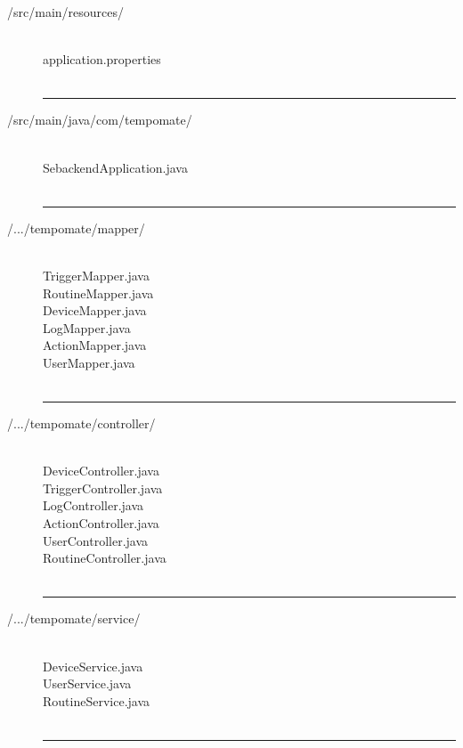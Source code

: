 \begin{enumerate}[label=\alph*]
\begin{description}
        \item[/src/main/resources/] \hfill \\
        \footnotesize
application.properties \\\\
    \vspace{-0.2cm}
    \hrule
    \vspace{0.2cm}

        \item[/src/main/java/com/tempomate/] \hfill \\
        \footnotesize
SebackendApplication.java \\\\
    \vspace{-0.2cm}
    \hrule
    \vspace{0.2cm}

        \item[/.../tempomate/mapper/] \hfill \\
        \footnotesize
TriggerMapper.java \\
RoutineMapper.java \\
DeviceMapper.java \\
LogMapper.java \\
ActionMapper.java \\
UserMapper.java \\\\
    \vspace{-0.2cm}
    \hrule
    \vspace{0.2cm}

        \item[/.../tempomate/controller/] \hfill \\
        \footnotesize
DeviceController.java \\
TriggerController.java \\
LogController.java \\
ActionController.java \\
UserController.java \\
RoutineController.java \\\\
    \vspace{-0.2cm}
    \hrule
    \vspace{0.2cm}

        \item[/.../tempomate/service/] \hfill \\
        \footnotesize
DeviceService.java \\
UserService.java \\
RoutineService.java \\\\
    \vspace{-0.2cm}
    \hrule
    \vspace{0.2cm}


\end{description}
\end{enumerate}

